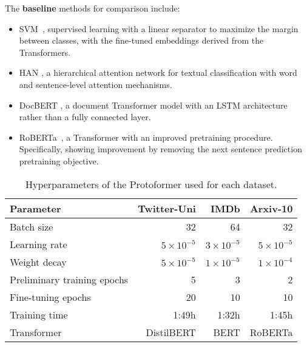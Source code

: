 \documentclass[letterpaper]{article} \usepackage{aaai22}  \usepackage{times}  \usepackage{helvet}  \usepackage{courier}  \usepackage{amsmath,amssymb}
\begin{document}
The {\bf baseline} methods for comparison include:
\begin{itemize}
\item SVM~\cite{svm2003}, supervised learning with a linear separator to maximize the margin between classes, with the fine-tuned embeddings derived from the Transformers. 
\item HAN \cite{krishnan2017structured}, a hierarchical attention network for textual classification with word and sentence-level attention mechanisms. \item DocBERT \cite{adhikari2019docbert}, a document Transformer model with an LSTM architecture rather than a fully connected layer.
\item RoBERTa~\cite{liu2019roberta}, a Transformer with an improved
pretraining procedure. Specifically, showing improvement by removing the next sentence prediction pretraining objective.
\end{itemize}




\begin{table}[!h]
 \centering
 \caption{Hyperparameters of the Protoformer used for each dataset.} 
\begin{tabular}{lrrr}
\hline Parameter & Twitter-Uni & IMDb & Arxiv-10 \\
\hline Batch size & 32 & 64 & 32 \\
Learning rate & $5 \times 10^{-5}$ & $3 \times 10^{-5}$ & $5 \times 10^{-5}$ \\
Weight decay & $5 \times 10^{-5}$ & $1 \times 10^{-5}$ & $1 \times 10^{-4}$ \\
Preliminary training epochs & 5 & 3 & 2 \\
Fine-tuning epochs & 20 & 10 & 10 \\
Training time & 1:49h & 1:32h & 1:45h \\
Transformer & DistilBERT & BERT & RoBERTa \\

\hline
\end{tabular} 

 \label{tab:hyper}

\end{table}
\end{document}
